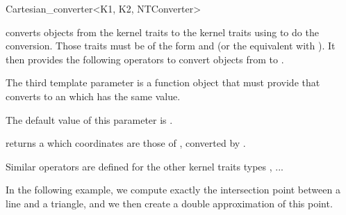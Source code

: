 \begin{ccRefClass}{Cartesian_converter<K1, K2, NTConverter>}

\KernelRefLayout\gdef\ccTagOperatorLayout{\ccFalse}

\ccDefinition

\ccClassTemplateName converts objects from the kernel traits  to
the kernel traits  using  to do the conversion.  
Those traits must be of the form
 and  (or the equivalent with
).  It then provides the following operators to convert
objects from  to .

The third template parameter  is a function object that must
provide  that converts  to an
 which has the same value.

The default value of this parameter is .


\ccCreation
{}


\ccOperations

{ returns a  which coordinates are those of ,
converted by .}

Similar operators are defined for the other kernel traits types ,
...


\ccExample

In the following example, we compute exactly 
the intersection point between a line and a triangle,
and we then create a double approximation of this point.




\ccSeeAlso
{} \\
 \\

\end{ccRefClass}
